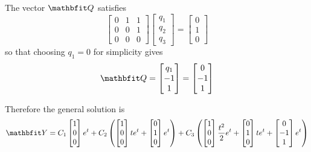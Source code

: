\begin{example}
The vector $\vect{Q}$ satisfies
$$\begin{bmatrix}0&1&1\\0&0&1\\0&0&0\end{bmatrix}
\begin{bmatrix}q_1\\q_2\\q_3\end{bmatrix}=\begin{bmatrix}0\\1\\0
\end{bmatrix}$$
so that choosing $q_1=0$ for simplicity gives
$$\vect{Q}=\begin{bmatrix}q_1\\-1\\1\end{bmatrix}
=\begin{bmatrix}0\\-1\\1\end{bmatrix}$$

Therefore the general solution is
$$\vect{Y}=C_1\begin{bmatrix}1\\0\\0\end{bmatrix}e^t+C_2\left(
\begin{bmatrix}1\\0\\0\end{bmatrix}te^t+
\begin{bmatrix}0\\1\\0\end{bmatrix}e^t
\right)+C_3\left(
\begin{bmatrix}1\\0\\0\end{bmatrix}\frac{t^2}{2}e^t+
\begin{bmatrix}0\\1\\0\end{bmatrix}te^t+
\begin{bmatrix}0\\-1\\1\end{bmatrix}e^t
\right)$$
\end{example}

